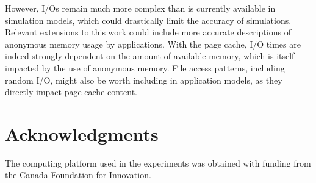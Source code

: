 \documentclass[conference]{IEEEtran}
\begin{document}
    However, I/Os remain much more complex than is currently available in
    simulation models, which could drastically limit the accuracy of simulations.
    Relevant extensions to this work could include more
    accurate descriptions of anonymous memory usage by applications. 
    With the page cache, I/O times are indeed strongly
    dependent on the amount of available memory, which is itself impacted
    by the use of anonymous memory. File access patterns, 
    including random I/O, might also be worth including in application models,
    as they directly impact page cache content.

        \section{Acknowledgments}
The computing platform used in the experiments was obtained with funding
from the Canada Foundation for Innovation.



\end{document}
